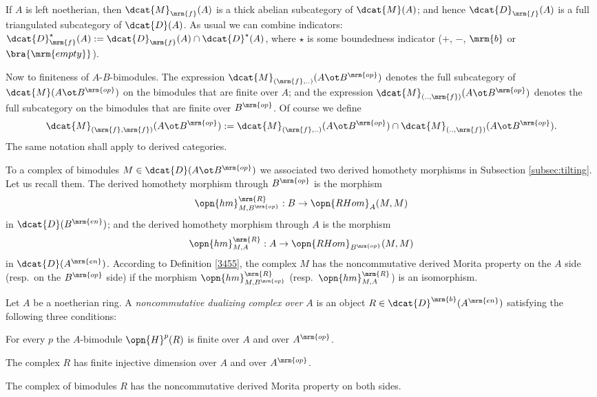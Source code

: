 If $A$ is left noetherian, then $\dcat{M}_{\mrm{f}}(A)$ is a thick abelian 
subcategory of $\dcat{M}(A)$; and hence $\dcat{D}_{\mrm{f}}(A)$ is a full 
triangulated subcategory of $\dcat{D}(A)$. 
As usual we can combine indicators: 
$\dcat{D}_{\mrm{f}}^{\star}(A) := \dcat{D}_{\mrm{f}}(A) \cap 
\dcat{D}^{\star}(A)$,
where $\star$ is some boundedness indicator ($+$, $-$, $\mrm{b}$ or
$\bra{\mrm{empty}}$). 

Now to finiteness of $A$-$B$-bimodules. The expression  
$\dcat{M}_{(\mrm{f}, ..)}(A \ot B^{\mrm{op}})$
denotes the full subcategory of $\dcat{M}(A \ot B^{\mrm{op}})$
on the bimodules that are finite over $A$; and the expression 
$\dcat{M}_{(.., \mrm{f})}(A \ot B^{\mrm{op}})$
denotes the full subcategory on the bimodules that are finite over 
$B^{\mrm{op}}$. Of course we define 
\[ \dcat{M}_{(\mrm{f}, \mrm{f})}(A \ot B^{\mrm{op}}) :=
\dcat{M}_{(\mrm{f}, ..)}(A \ot B^{\mrm{op}}) \cap 
\dcat{M}_{(.., \mrm{f})}(A \ot B^{\mrm{op}}) . \]
The same notation shall apply to derived categories. 

To a complex of bimodules 
$M \in \dcat{D}(A \ot B^{\mrm{op}})$ 
we associated two derived homothety morphisms in Subsection 
\ref{subsec:tilting}. Let us recall them. 
The derived homothety morphism through $B^{\mrm{op}}$ is the morphism 
\begin{equation} \label{equ:4336}
\opn{hm}^{\mrm{R}}_{M, B^{\mrm{op}}} : B \to \opn{RHom}_{A}(M, M)  
\end{equation}
in $\dcat{D}(B^{\mrm{en}})$; and the derived homothety morphism through $A$ 
is the morphism 
\begin{equation} \label{equ:4337}
\opn{hm}^{\mrm{R}}_{M, A} : A \to \opn{RHom}_{B^{\mrm{op}}}(M, M) 
\end{equation}
in $\dcat{D}(A^{\mrm{en}})$. 
According to Definition \ref{3455}, the complex $M$ has the  
noncommutative derived Morita property on the $A$ side (resp.\ on the 
$B^{\mrm{op}}$ side) if the morphism 
$\opn{hm}^{\mrm{R}}_{M, B^{\mrm{op}}}$
(resp.\ $\opn{hm}^{\mrm{R}}_{M, A}$) is an isomorphism. 

\begin{dfn}[\cite{Ye4}] \label{dfn:3675} 
Let $A$ be a noetherian ring. A 
{\em noncommutative dualizing complex over $A$} 
is an object 
$R \in \dcat{D}^{\mrm{b}}(A^{\mrm{en}})$ satisfying the 
following three conditions:
\begin{itemize}
 For every $p$ the 
$A$-bimodule $\opn{H}^p(R)$ is finite over $A$ and over $A^{\mrm{op}}$. 

 The complex $R$ has finite injective 
dimension over $A$ and over $A^{\mrm{op}}$. 

 The complex of bimodules $R$ has the noncommutative derived Morita 
property on both sides. 
\end{itemize}
\end{dfn}

